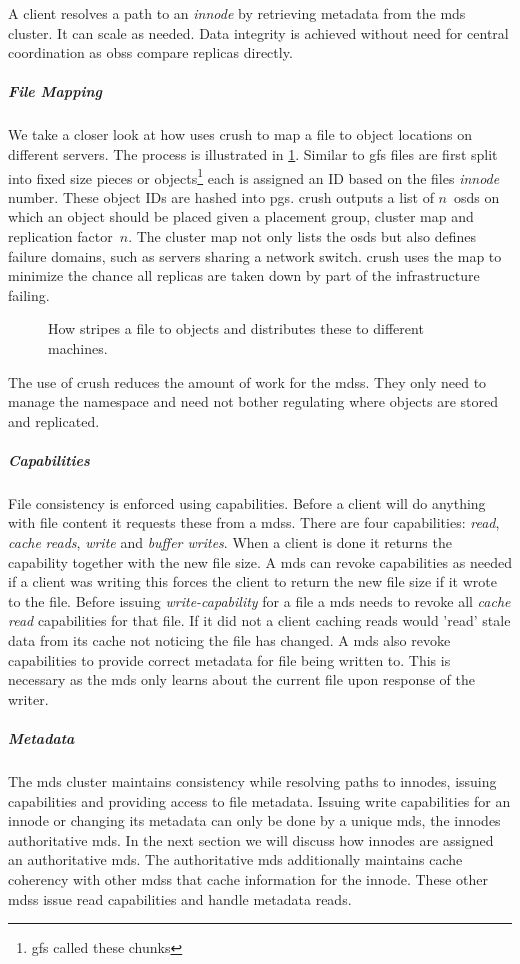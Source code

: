 A client resolves a path to an \textit{innode} by retrieving metadata from the \ac{mds} cluster. It can scale as needed. Data integrity is achieved without need for central coordination as \acp{obs} compare replicas directly. 
%
\subparagraph{File Mapping}
We take a closer look at how \ceph{} uses \ac{crush} to map a file to object locations on different servers. The process is illustrated in \cref{fig:ceph_crush}. Similar to \ac{gfs} files are first split into fixed size pieces or objects\footnote{\ac{gfs} called these chunks} each is assigned an ID based on the files \textit{innode} number. These object IDs are hashed into \acp{pg}. \ac{crush} outputs a list of $n$~\acp{osd} on which an object should be placed given a placement group, cluster map and replication factor~$n$. The cluster map not only lists the \acp{osd} but also defines failure domains, such as servers sharing a network switch. \ac{crush} uses the map to minimize the chance all replicas are taken down by part of the infrastructure failing.

\begin{figure}[htbp]
	\centering
	
	\caption{How \ceph{} stripes a file to objects and distributes these to different machines.}
	\label{fig:ceph_crush}
\end{figure}

The use of \ac{crush} reduces the amount of work for the \acp{mds}. They only need to manage the namespace and need not bother regulating where objects are stored and replicated.
%
\subparagraph{Capabilities}
File consistency is enforced using capabilities. Before a client will do anything with file content it requests these from a \acp{mds}. There are four capabilities: \textit{read}, \textit{cache} \textit{reads}, \textit{write} and \textit{buffer writes}. When a client is done it returns the capability together with the new file size. A \ac{mds} can revoke capabilities as needed if a client was writing this forces the client to return the new file size if it wrote to the file. Before issuing \textit{write-capability} for a file a \ac{mds} needs to revoke all \textit{cache read} capabilities for that file. If it did not a client caching reads would 'read' stale data from its cache not noticing the file has changed. A \ac{mds} also revoke capabilities to provide correct metadata for file being written to. This is necessary as the \ac{mds} only learns about the current file upon response of the writer.
%
\subparagraph{Metadata}
The \ac{mds} cluster maintains consistency while resolving paths to innodes, issuing capabilities and providing access to file metadata. Issuing write capabilities for an innode or changing its metadata can only be done  by a unique \ac{mds}, the innodes authoritative \ac{mds}. In the next section we will discuss how innodes are assigned an authoritative \ac{mds}. The authoritative \ac{mds} additionally maintains cache coherency with other \acp{mds} that cache information for the innode. These other \acp{mds} issue read capabilities and handle metadata reads.

